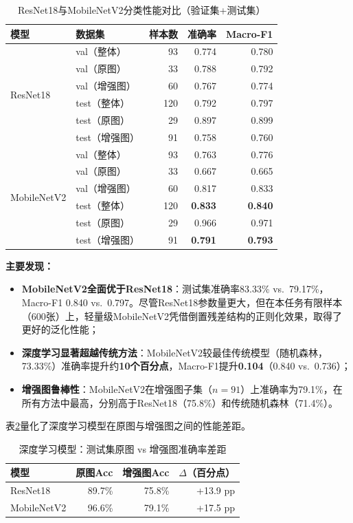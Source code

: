 \documentclass[UTF8,a4paper,12pt]{ctexart}
\numberwithin{figure}{section}
\numberwithin{table}{section}
\begin{document}
\begin{table}[H]
\centering
\caption{ResNet18与MobileNetV2分类性能对比（验证集+测试集）}
\label{tab:dl_main}
\small
\begin{tabular}{llrrr}
\toprule
\textbf{模型} & \textbf{数据集} & \textbf{样本数} & \textbf{准确率} & \textbf{Macro-F1} \\
\midrule
\multirow{6}{*}{ResNet18}
& val（整体）  & 93  & 0.774 & 0.780 \\
& val（原图）  & 33  & 0.788 & 0.792 \\
& val（增强图）& 60  & 0.767 & 0.774 \\
& test（整体） & 120 & 0.792 & 0.797 \\
& test（原图） & 29  & 0.897 & 0.899 \\
& test（增强图）& 91 & 0.758 & 0.760 \\
\midrule
\multirow{6}{*}{MobileNetV2}
& val（整体）  & 93  & 0.763 & 0.776 \\
& val（原图）  & 33  & 0.667 & 0.665 \\
& val（增强图）& 60  & 0.817 & 0.833 \\
& test（整体） & 120 & \textbf{0.833} & \textbf{0.840} \\
& test（原图） & 29  & 0.966 & 0.971 \\
& test（增强图）& 91 & \textbf{0.791} & \textbf{0.793} \\
\bottomrule
\end{tabular}
\end{table}

\textbf{主要发现：}
\begin{itemize}
    \item \textbf{MobileNetV2全面优于ResNet18}：测试集准确率83.33\% vs.\ 79.17\%，Macro-F1 0.840 vs.\ 0.797。尽管ResNet18参数量更大，但在本任务有限样本（600张）上，轻量级MobileNetV2凭借倒置残差结构的正则化效果，取得了更好的泛化性能；
    \item \textbf{深度学习显著超越传统方法}：MobileNetV2较最佳传统模型（随机森林，73.33\%）准确率提升约\textbf{10个百分点}，Macro-F1提升\textbf{0.104}（0.840 vs.\ 0.736）；
    \item \textbf{增强图鲁棒性}：MobileNetV2在增强图子集（$n=91$）上准确率为79.1\%，在所有方法中最高，分别高于ResNet18（75.8\%）和传统随机森林（71.4\%）。
\end{itemize}

表\ref{tab:dl_gap}量化了深度学习模型在原图与增强图之间的性能差距。

\begin{table}[H]
\centering
\caption{深度学习模型：测试集原图 vs 增强图准确率差距}
\label{tab:dl_gap}
\begin{tabular}{lrrr}
\toprule
\textbf{模型} & \textbf{原图Acc} & \textbf{增强图Acc} & \textbf{$\Delta$（百分点）} \\
\midrule
ResNet18     & 89.7\% & 75.8\% & +13.9 pp \\
MobileNetV2  & 96.6\% & 79.1\% & +17.5 pp \\
\bottomrule
\end{tabular}
\end{table}
\end{document}
